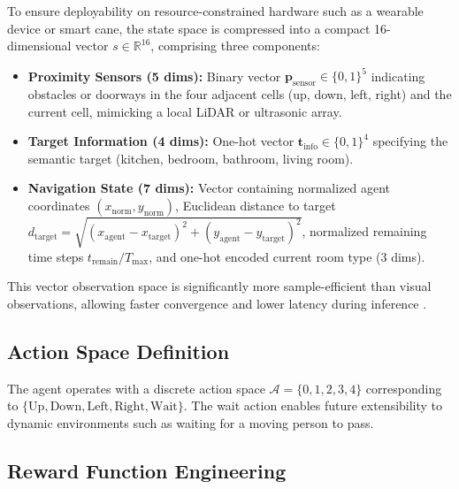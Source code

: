 \documentclass{article}
\begin{document}
To ensure deployability on resource-constrained hardware such as a wearable
device or smart cane, the state space is compressed into a compact
16-dimensional vector $s \in \mathbb{R}^{16}$, comprising three components:
\begin{itemize}
    \item \textbf{Proximity Sensors (5 dims):} Binary vector
    $\mathbf{p}_\text{sensor} \in \{0,1\}^5$ indicating obstacles or doorways
    in the four adjacent cells (up, down, left, right) and the current cell,
    mimicking a local LiDAR or ultrasonic array.
    \item \textbf{Target Information (4 dims):} One-hot vector
    $\mathbf{t}_\text{info} \in \{0,1\}^4$ specifying the semantic target
    (kitchen, bedroom, bathroom, living room).
    \item \textbf{Navigation State (7 dims):} Vector containing normalized agent
    coordinates $(x_\text{norm}, y_\text{norm})$, Euclidean distance to target
    $d_\text{target} = \sqrt{(x_\text{agent}-x_\text{target})^2 +
    (y_\text{agent}-y_\text{target})^2}$, normalized remaining time steps
    $t_\text{remain}/T_\text{max}$, and one-hot encoded current room type
    (3 dims).
\end{itemize}
This vector observation space is significantly more sample-efficient than visual
observations, allowing faster convergence and lower latency during inference
\cite{vijetha2023}.

\subsection{Action Space Definition}

The agent operates with a discrete action space $\mathcal{A} = \{0,1,2,3,4\}$
corresponding to $\{\text{Up}, \text{Down}, \text{Left}, \text{Right},
\text{Wait}\}$. The wait action enables future extensibility to dynamic
environments such as waiting for a moving person to pass.

\subsection{Reward Function Engineering}
\end{document}
